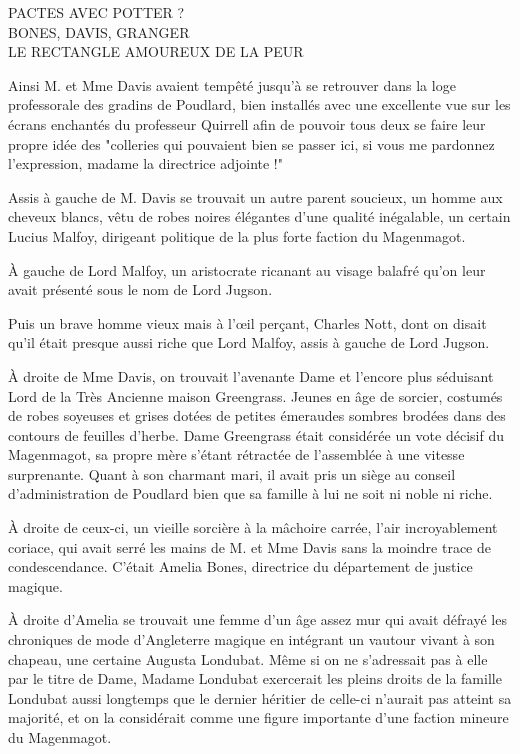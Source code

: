 \begin{center}PACTES AVEC POTTER ?\\BONES, DAVIS, GRANGER\\LE RECTANGLE AMOUREUX DE LA PEUR\end{center}


Ainsi M. et Mme Davis avaient tempêté jusqu'à se retrouver dans la loge professorale des gradins de Poudlard, bien installés avec une excellente vue sur les écrans enchantés du professeur Quirrell afin de pouvoir tous deux se faire leur propre idée des "colleries qui pouvaient bien se passer ici, si vous me pardonnez l'expression, madame la directrice adjointe !"

Assis à gauche de M. Davis se trouvait un autre parent soucieux, un homme aux cheveux blancs, vêtu de robes noires élégantes d'une qualité inégalable, un certain Lucius Malfoy, dirigeant politique de la plus forte faction du Magenmagot.

À gauche de Lord Malfoy, un aristocrate ricanant au visage balafré qu'on leur avait présenté sous le nom de Lord Jugson.

Puis un brave homme vieux mais à l'œil perçant, Charles Nott, dont on disait qu'il était presque aussi riche que Lord Malfoy, assis à gauche de Lord Jugson.

À droite de Mme Davis, on trouvait l'avenante Dame et l'encore plus séduisant Lord de la Très Ancienne maison Greengrass. Jeunes en âge de sorcier, costumés de robes soyeuses et grises dotées de petites émeraudes sombres brodées dans des contours de feuilles d'herbe. Dame Greengrass était considérée un vote décisif du Magenmagot, sa propre mère s'étant rétractée de l'assemblée à une vitesse surprenante. Quant à son charmant mari, il avait pris un siège au conseil d'administration de Poudlard bien que sa famille à lui ne soit ni noble ni riche.

À droite de ceux-ci, un vieille sorcière à la mâchoire carrée, l'air incroyablement coriace, qui avait serré les mains de M. et Mme Davis sans la moindre trace de condescendance. C'était Amelia Bones, directrice du département de justice magique.

À droite d'Amelia se trouvait une femme d'un âge assez mur qui avait défrayé les chroniques de mode d'Angleterre magique en intégrant un vautour vivant à son chapeau, une certaine Augusta Londubat. Même si on ne s'adressait pas à elle par le titre de Dame, Madame Londubat exercerait les pleins droits de la famille Londubat aussi longtemps que le dernier héritier de celle-ci n'aurait pas atteint sa majorité, et on la considérait comme une figure importante d'une faction mineure du Magenmagot.

